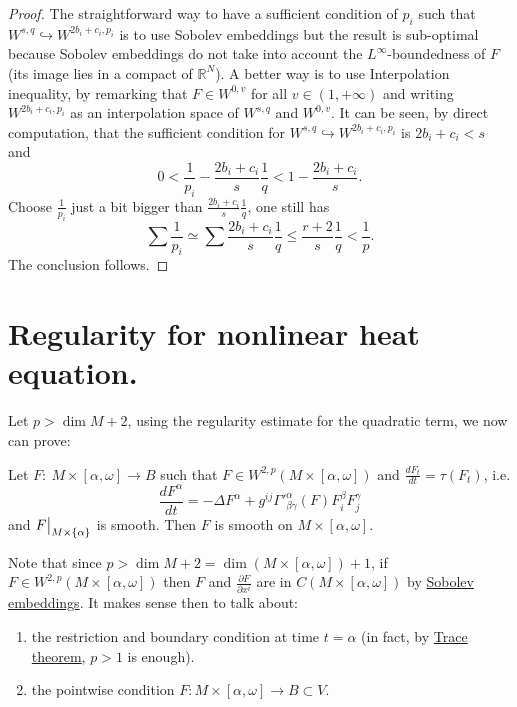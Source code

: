 \begin{proof}
The straightforward way to have a sufficient condition of \(p_i\) such that \(W^{s,q}
\hookrightarrow W^{2b_i+c_i,p_i}\) is to use Sobolev embeddings but the result is sub-optimal
because Sobolev embeddings do not take into account the \(L^\infty\)-boundedness of \(F\) (its image lies in a compact of \(\mathbb{R}^N\)). A better way is to use
Interpolation inequality, by remarking that \(F\in W^{0,v}\) for all \(v\in (1,+\infty)\) and writing \(W^{2b_i+c_i, p_i}\) as an interpolation space of \(W^{s,q}\) and \(W^{0,v}\). It can be seen, by direct computation, that the sufficient condition for \(W^{s,q}
\hookrightarrow W^{2b_i+c_i,p_i}\) is \(2b_i+c_i < s\) and
\[
 0 < \frac{1}{p_i} - \frac{2b_i+c_i}{s}\frac{1}{q} < 1 - \frac{2b_i + c_i}{s}.
\]
Choose \(\frac{1}{p_i}\) just a bit bigger than \(\frac{2b_i+c_i}{s}\frac{1}{q}\), one
still has
\[
\sum \frac{1}{p_i} \simeq \sum  \frac{2b_i+c_i}{s}\frac{1}{q} \leq \frac{r+2}{s}\frac{1}{q} < \frac{1}{p}.
\]
The conclusion follows.  
\end{proof}



\section{Regularity for nonlinear heat equation.}
\label{sec:orgfa5214c}
Let \(p>\dim M + 2\), using the regularity estimate for the quadratic term, we now can prove:

\begin{theorem}
\label{thm:reg-nonlin-heat}
Let \(F:\ M\times [\alpha,\omega] \longrightarrow B\) such that \(F\in W^{2,p}(M\times
[\alpha,\omega])\) and \(\frac{d F_t}{dt} = \tau(F_t)\), i.e.
\[
 \frac{d F^\alpha}{dt} = -\Delta F^\alpha + g^{ij}\Gamma'^\alpha_{\beta\gamma}(F)
F^\beta_i F^\gamma_j
\]
and \(\restr{F}{M\times\{\alpha\}}\) is smooth. Then \(F\) is smooth on \(M\times [\alpha,\omega]\).
\end{theorem}

\begin{remark}
Note that since \(p > \dim M + 2 = \dim (M\times [\alpha,\omega])+1\), if \(F\in
W^{2,p}(M\times[\alpha,\omega])\) then \(F\) and \(\frac{\partial F}{\partial
x^i}\) are in \(C(M\times[\alpha,\omega])\) by \href{sobolev-riemannian.org}{Sobolev embeddings}. It makes sense then to talk
about:
\begin{enumerate}
\item the restriction and boundary condition at time \(t=\alpha\) (in fact, by \href{interpolation-sobolev.org}{Trace theorem}, \(p>1\) is enough).
\item the pointwise condition \(F: M\times [\alpha,\omega] \longrightarrow
   B\subset V\).
\end{enumerate}
\end{remark}

